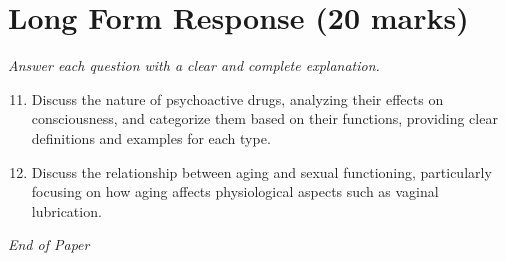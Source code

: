 \documentclass[12pt]{article}
\begin{document}
\section*{Long Form Response (20 marks)}
\textit{Answer each question with a clear and complete explanation.}
\begin{enumerate}[label=\arabic*.]
\setcounter{enumi}{10}
\item Discuss the nature of psychoactive drugs, analyzing their effects on consciousness, and categorize them based on their functions, providing clear definitions and examples for each type.
\item Discuss the relationship between aging and sexual functioning, particularly focusing on how aging affects physiological aspects such as vaginal lubrication.
\end{enumerate}

\vfill
\noindent\textit{End of Paper}
\end{document}
